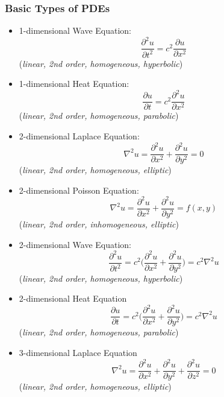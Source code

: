 \subsubsection{Basic Types of PDEs}
\begin{itemize}
    \item 1-dimensional Wave Equation:
          \begin{equation}
              \frac{\partial ^2 u}{\partial t^2} = c^2\frac{\partial u}{\partial x^2}
          \end{equation}
          (\textit{linear, 2nd order, homogeneous, hyperbolic})
    \item 1-dimensional Heat Equation:
          \begin{equation}
              \frac{\partial u}{\partial t} = c^2 \frac{\partial ^2 u}{\partial x^2}
          \end{equation}
          (\textit{linear, 2nd order, homogeneous, parabolic})
    \item 2-dimensional Laplace Equation:
          \begin{equation}
              \nabla^2 u=\frac{\partial^2 u}{\partial x^2}+\frac{\partial ^2 u}{\partial y^2}=0
          \end{equation}
          (\textit{linear, 2nd order, homogeneous, elliptic})
    \item 2-dimensional Poisson Equation:
          \begin{equation}
              \nabla^2 u=\frac{\partial^2 u}{\partial x^2}+\frac{\partial^2 u}{\partial y^2}=f(x,y)
          \end{equation}
          (\textit{linear, 2nd order, inhomogeneous, elliptic})
    \item 2-dimensional Wave Equation:
          \begin{equation}
              \frac{\partial^2u}{\partial t^2}=c^2 \Bigr(\frac{\partial^2 u}{\partial x^2}+\frac{\partial ^2 u}{\partial y^2}\Bigr)=c^2\nabla^2 u
          \end{equation}
          (\textit{linear, 2nd order, homogeneous, hyperbolic})
    \item 2-dimensional Heat Equation
          \begin{equation}
              \frac{\partial u}{\partial t}=c^2\Bigr(\frac{\partial^2 u}{\partial x^2}+\frac{\partial ^2 u}{\partial y^2}\Bigr)=c^2\nabla^2 u
          \end{equation}
          (\textit{linear, 2nd order, homogeneous, parabolic})
    \item 3-dimensional Laplace Equation
          \begin{equation}
              \nabla^2 u=\frac{\partial^2 u}{\partial x^2}+\frac{\partial ^2 u}{\partial y^2}+\frac{\partial ^2 u}{\partial z^2}=0
          \end{equation}
          (\textit{linear, 2nd order, homogeneous, elliptic})
\end{itemize}
%
%
